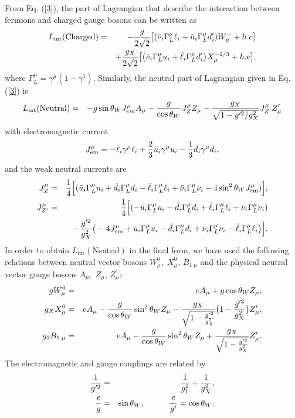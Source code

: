 \documentclass{ws-ijmpa}
\begin{document}
From Eq. (\ref{3}), the part of Lagrangian that describe the interaction between fermions and charged gauge bosons can be written as
\begin{eqnarray}
L_{\text{int}}(\text{Charged})&=&-{g\over
2\sqrt2}\big[(\bar\nu_i\Gamma^{\mu}_L\ell_i+\bar u_i\Gamma^{\mu}_L
d_i^{\prime})W_{\mu}^{+}+h.c\big] \notag\\
&&+ {g_{X}\over
2\sqrt2}\big[\big(\bar\nu_i\Gamma^{\mu}_L
u_i+\bar \ell_i\Gamma^{\mu}_L
d^{\prime}_i\big)X_\mu^{-2/3}+h.c\big]\label{4},
\end{eqnarray}
where $\Gamma_L^\mu=\gamma^\mu(1-\gamma^5)$. Similarly, the neutral part of Lagrangian given in Eq. (\ref{3}) is
\begin{eqnarray}
L_{\text{int}}(\text{Neutral})&=&-g\sin\theta_W J^{\mu}_{em}A_{\mu}-{g\over\cos\theta_W}J_{Z}^{\mu}Z_{\mu}-\frac{g_X}{\sqrt{1-g^{\prime
2}/g_X^2}}J_{Z^{\prime}}^{\mu}Z^{\prime}_{\mu}\label{5}
\end{eqnarray}
with electromagnetic current
\begin{equation}
J_{\text{em}}^{\mu}=-\bar{\ell}_i\gamma^{\mu} \ell_i+{2\over 3}\bar
u_i\gamma^{\mu}u_i -{1\over 3}\bar
d_i\gamma^{\mu}d_i \label{6},
\end{equation}
and the weak neutral currents are
\begin{eqnarray}
J_{Z}^{\mu}&=&{1\over4}\Big[(\bar u_i\Gamma^{\mu}_L u_i+\bar
d_i\Gamma^{\mu}_Ld_i -\bar
\ell_i\Gamma^{\mu}_L\ell_i+\bar\nu_i\Gamma^{\mu}_L\nu_i-4\sin^2\theta_W J_{\text{em}}^{\mu})\Big]\notag ,\\
J_{Z^{\prime}}^{\mu}&=&{1\over4}\Big[(-\bar u_i\Gamma^{\mu}_L u_i-\bar
d_i\Gamma^{\mu}_Ld_i +\bar
\ell_i\Gamma^{\mu}_L\ell_i +\bar\nu_i\Gamma^{\mu}_L\nu_i)\notag\\
&&-{g^{\prime 2}\over g_X^{2}}\big(-4J_{\text{em}}^{\mu}+\bar
u_i\Gamma^{\mu}_L u_i-\bar d_i\Gamma^{\mu}_Ld_i
+\bar\nu_i\Gamma^{\mu}_L\nu_i-\bar
\ell_i\Gamma^{\mu}_L\ell_i\big)\Big]\label{7}.
\end{eqnarray}
In order to obtain $L_{\text{int}}(\text{Neutral})$ in the final form, we have used the following relations between neutral vector bosons $W_{\mu}^{0},\; X_{\mu}^{0}$, $B_{1\;\mu}$ and the physical neutral vector gauge bosons $A_{\mu},\; Z_{\mu}$, $Z^{\prime}_{\mu}$:
\begin{eqnarray}
gW_{\mu}^{0}&=& eA_{\mu}+g\cos \theta_{W} Z_{\mu}\notag ,\\
g_{X}X_{\mu}^{0}&=& eA_{\mu}-{g\over \cos \theta_{W}}\sin^{2}\theta_{W}Z_{\mu}-{g_{X}\over \sqrt{1-{g^{\prime 2} \over g_X^{2}}}}\big(1-{g^{\prime 2} \over g_X^{2}}\big)Z^{\prime}_{\mu}\notag ,\\
g_{1}B_{1\;\mu}&=&eA_{\mu}-{g\over \cos \theta_{W}}\sin^{2}\theta_{W}Z_{\mu}+{g_{X}\over \sqrt{1-{g^{\prime 2} \over g_X^{2}}}}Z^{\prime}_{\mu} \label{8}.
\end{eqnarray}
The electromagnetic and gauge couplings are related by
\begin{eqnarray}
{1\over g^{\prime 2}}&=&{1\over g^{2}_1}+{1\over g^{2}_X}\notag ,\\
{e\over g}&=&\sin \theta_{W}, \quad\quad\quad {e\over g^{\prime}}=\cos \theta_{W} \label{9}.
\end{eqnarray}
\end{document}
